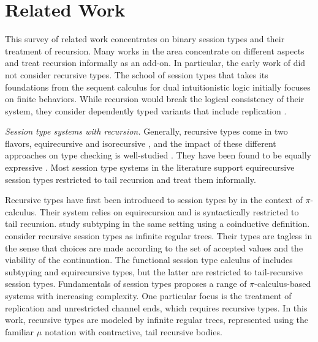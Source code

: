 \section{Related Work}
\label{sec:related}

This survey of related work concentrates on binary session types and their
treatment of recursion. Many works in the area concentrate on different aspects
and treat recursion informally as an add-on. In particular, the early work of
\citet{DBLP:conf/parle/TakeuchiHK94,DBLP:conf/concur/Honda93} did not consider
recursive types.
%
The school of session types that takes its foundations from the
sequent calculus for dual intuitionistic logic
\cite{DBLP:conf/concur/CairesP10,DBLP:journals/mscs/CairesPT16}
initially focuses on finite behaviors. While
recursion would break the logical consistency of their system, they
consider dependently typed variants that include replication
\cite{DBLP:conf/cpp/PfenningCT11}. 

\smallskip
\emph{Session type systems with recursion.}
Generally, recursive types come in two flavors, equirecursive and
isorecursive \cite{DBLP:conf/lics/AbadiF96}, and the impact of
these different approaches on type checking is well-studied
\cite{DBLP:books/daglib/0005958}. They have been found to be equally 
expressive \cite{DBLP:journals/pacmpl/PatrignaniMD21}. Most
session type systems in the literature support equirecursive session
types restricted to tail recursion and treat them informally.

Recursive types have first been introduced to session types by
\citet{DBLP:conf/esop/HondaVK98} in the context of $\pi$-calculus. Their
system relies on equirecursion and is syntactically restricted to
tail recursion.
\citet{DBLP:conf/esop/GayH99,DBLP:journals/acta/GayH05} study
subtyping in the same setting using a coinductive definition. 
%
\citet{DBLP:conf/ppdp/CastagnaDGP09} consider recursive session types
as infinite regular trees. Their types are tagless in the sense that
choices are made according to the set of accepted values and the viability
of the continuation.
%
The functional session type calculus of
\citet{DBLP:journals/jfp/GayV10} includes subtyping and equirecursive
types, but the latter are restricted to tail-recursive session types.
%
Fundamentals of session types \cite{DBLP:journals/iandc/Vasconcelos12}
proposes a range of $\pi$-calculus-based systems with increasing
complexity. One particular focus is the treatment of replication and unrestricted
channel ends, which requires recursive types. In this work, recursive
types are modeled by infinite regular trees, represented using the
familiar $\mu$ notation with contractive, tail recursive bodies.

